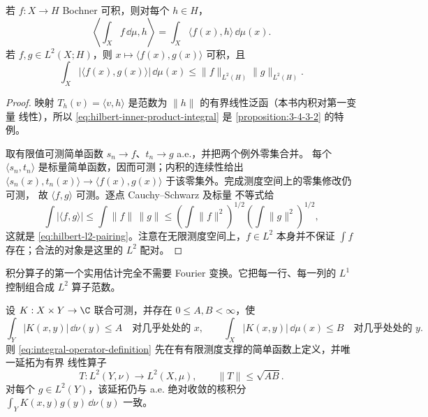 \begin{proposition}\label{proposition:3-4-3-3}
若 $f:X\to H$ Bochner 可积，则对每个 $h\in H$，
\[
 \left\langle\int_Xf\,\dd\mu,h\right\rangle
 =\int_X\langle f(x),h\rangle\,\dd\mu(x).
 \tag{3.4.21}\label{eq:hilbert-inner-product-integral}
\]
若 $f,g\in L^2(X;H)$，则 $x\mapsto\langle f(x),g(x)\rangle$ 可积，且
\[
 \int_X|\langle f(x),g(x)\rangle|\,\dd\mu(x)
 \le\|f\|_{L^2(H)}\|g\|_{L^2(H)}.
 \tag{3.4.22}\label{eq:hilbert-l2-pairing}
\]
\end{proposition}

\begin{proof}
映射 $T_h(v)=\langle v,h\rangle$ 是范数为 $\|h\|$ 的有界线性泛函（本书内积对第一变量
线性），所以 \eqref{eq:hilbert-inner-product-integral} 是
\cref{proposition:3-4-3-2} 的特例。

取有限值可测简单函数 $s_n\to f$、$t_n\to g$ a.e.，并把两个例外零集合并。
每个 $\langle s_n,t_n\rangle$ 是标量简单函数，因而可测；内积的连续性给出
$\langle s_n(x),t_n(x)\rangle\to\langle f(x),g(x)\rangle$ 于该零集外。完成测度空间上的零集修改仍可测，
故 $\langle f,g\rangle$ 可测。逐点 Cauchy--Schwarz 及标量 \Holder{} 不等式给
\[
 \int|\langle f,g\rangle|
 \le\int\|f\|\,\|g\|
 \le\left(\int\|f\|^2\right)^{1/2}
      \left(\int\|g\|^2\right)^{1/2},
\]
这就是 \eqref{eq:hilbert-l2-pairing}。注意在无限测度空间上，$f\in L^2$ 本身并不保证
$\int f$ 存在；合法的对象是这里的 $L^2$ 配对。
\end{proof}

积分算子的第一个实用估计完全不需要 Fourier 变换。它把每一行、每一列的 $L^1$ 控制组合成
$L^2$ 算子范数。

\begin{theorem}\label{theorem:3-4-3-4}
设 $K:X\times Y\to\C$ 联合可测，并存在 $0\le A,B<\infty$，使
\[
 \int_Y|K(x,y)|\,\dd\nu(y)\le A\quad\text{对几乎处处的 }x,
 \qquad
 \int_X|K(x,y)|\,\dd\mu(x)\le B\quad\text{对几乎处处的 }y.
 \tag{3.4.23}\label{eq:schur-row-column}
\]
则 \eqref{eq:integral-operator-definition} 先在有有限测度支撑的简单函数上定义，并唯一延拓为有界
线性算子
\[
 T:L^2(Y,\nu)\longrightarrow L^2(X,\mu),
 \qquad \|T\|\le\sqrt{AB}.
\]
对每个 $g\in L^2(Y)$，该延拓仍与 a.e. 绝对收敛的核积分
$\int_YK(x,y)g(y)\,\dd\nu(y)$ 一致。
\end{theorem}

